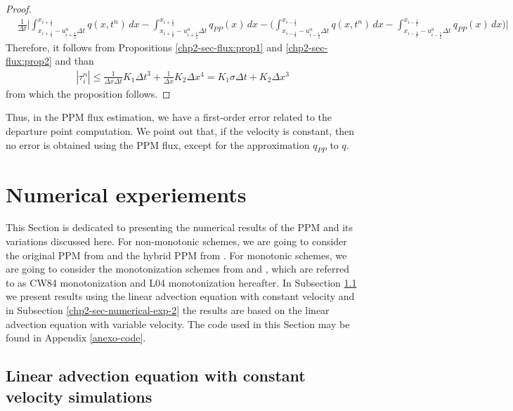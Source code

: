 \begin{proof}
\begin{align*}
     &\frac{1}{\Delta t}\bigg| 
	 \int^{x_{i+\frac{1}{2}}}_{x_{i+\frac{1}{2}}-u_{i+\frac{1}{2}}^n \Delta t} q(x,t^n)\,dx 
	-\int^{x_{i+\frac{1}{2}}}_{x_{i+\frac{1}{2}}-u_{i+\frac{1}{2}}^n \Delta t} q_{PP}(x) \,dx 
	-\bigg(\int^{x_{i-\frac{1}{2}}}_{x_{i-\frac{1}{2}}-u_{i-\frac{1}{2}}^n \Delta t} q(x,t^n)\,dx 
	-\int^{x_{i-\frac{1}{2}}}_{x_{i-\frac{1}{2}}-u_{i-\frac{1}{2}}^n \Delta t} q_{PP}(x) \,dx 
	\bigg) \bigg| 
	\end{align*}
	Therefore, it follows from Propositions \ref{chp2-sec-flux:prop1} and \ref{chp2-sec-flux:prop2} and than
	\begin{align*}
		|\tau_i^n| \leq \frac{1}{\Delta x \Delta t} K_1 \Delta t^3 + \frac{1}{\Delta x} K_2 \Delta x^4 = 
		K_1 \sigma \Delta t + K_2 \Delta x^3
	\end{align*}
	from which the proposition follows.
\end{proof}

Thus, in the PPM flux estimation, we have a first-order error related to the departure point
computation. We point out that, if the velocity is constant, then no error is obtained
using the PPM flux, except for the approximation $q_{PP}$ to $q$.
\newpage
\section{Numerical experiements}
\label{chp2-sec-numerical-exp}
This Section is dedicated to presenting the numerical results of the PPM and its variations discussed here.
For non-monotonic schemes, we are going to consider
the original PPM from \citet{colella:1984} and the hybrid PPM from \citet{putman:2007}.
For monotonic schemes, we are going to consider the monotonization schemes from 
\citet{colella:1984} and \citet{lin:2004}, which are referred to as CW84 monotonization 
and L04 monotonization hereafter.
In Subsection \ref{chp2-sec-numerical-exp-1} we present results 
using the linear advection equation with constant velocity
and in Subsection \ref{chp2-sec-numerical-exp-2}
the results are based on the linear advection equation with variable velocity.
The code used in this Section may be found in Appendix \ref{anexo-code}.

\subsection{Linear advection equation with constant velocity simulations}
\label{chp2-sec-numerical-exp-1}

